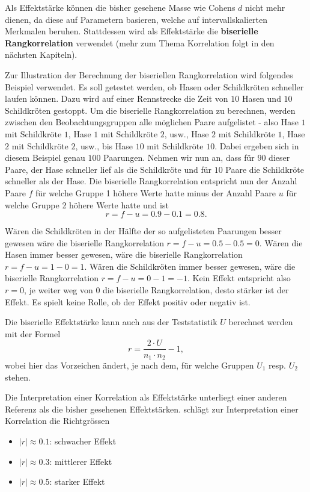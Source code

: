 \documentclass[
]{book}
\providecommand{\tightlist}{%
  \setlength{\itemsep}{0pt}\setlength{\parskip}{0pt}}
\theoremstyle{definition}
\theoremstyle{definition}
\theoremstyle{definition}
\theoremstyle{definition}
\theoremstyle{remark}
\begin{document}
Als Effektstärke können die bisher gesehene Masse wie Cohens \(d\) nicht
mehr dienen, da diese auf Parametern basieren, welche auf
intervallskalierten Merkmalen beruhen. Stattdessen wird als Effektstärke
die \label{customdef-biserielle-rangkorrelation}{\textbf{biserielle
Rangkorrelation}} verwendet (mehr zum Thema Korrelation folgt in den nächsten
Kapiteln).

Zur Illustration der Berechnung der biseriellen Rangkorrelation wird
folgendes Beispiel verwendet. Es soll getestet werden, ob Hasen oder
Schildkröten schneller laufen können. Dazu wird auf einer Rennstrecke
die Zeit von \(10\) Hasen und \(10\) Schildkröten gestoppt. Um die
biserielle Rangkorrelation zu berechnen, werden zwischen den
Beobachtungsgruppen alle möglichen Paare aufgelistet - also Hase \(1\) mit
Schildkröte \(1\), Hase \(1\) mit Schildkröte \(2\), usw., Hase \(2\) mit
Schildkröte \(1\), Hase \(2\) mit Schildkröte \(2\), usw., bis Hase \(10\) mit
Schildkröte \(10\). Dabei ergeben sich in diesem Beispiel genau \(100\)
Paarungen. Nehmen wir nun an, dass für \(90\) dieser Paare, der Hase
schneller lief als die Schildkröte und für \(10\) Paare die Schildkröte
schneller als der Hase. Die biserielle Rangkorrelation entspricht nun
der Anzahl Paare \(f\) für welche Gruppe 1 höhere Werte hatte minus der
Anzahl Paare \(u\) für welche Gruppe 2 höhere Werte hatte und ist
\[r = f - u = 0.9 - 0.1 = 0.8.\]

Wären die Schildkröten in der Hälfte der so aufgelisteten Paarungen
besser gewesen wäre die biserielle Rangkorrelation
\(r = f-u=0.5 - 0.5 = 0\). Wären die Hasen immer besser gewesen, wäre die
biserielle Rangkorrelation \(r = f-u = 1-0 = 1\). Wären die Schildkröten
immer besser gewesen, wäre die biserielle Rangkorrelation
\(r = f-u = 0-1 = -1\). Kein Effekt entspricht also \(r = 0\), je weiter weg
von \(0\) die biserielle Rangkorrelation, desto stärker ist der Effekt. Es
spielt keine Rolle, ob der Effekt positiv oder negativ ist.

Die biserielle Effektstärke kann auch aus der Teststatistik \(U\)
berechnet werden mit der Formel \[r = \frac{2\cdot U}{n_1\cdot n_2}-1,\]
wobei hier das Vorzeichen ändert, je nach dem, für welche Gruppen \(U_1\)
resp. \(U_2\) stehen.

Die Interpretation einer Korrelation als Effektstärke unterliegt einer
anderen Referenz als die bisher gesehenen Effektstärken. \citet{cohen1988}
schlägt zur Interpretation einer Korrelation die Richtgrössen

\begin{itemize}
\tightlist
\item
  \(|r| \approx 0.1\): schwacher Effekt
\item
  \(|r| \approx 0.3\): mittlerer Effekt
\item
  \(|r| \approx 0.5\): starker Effekt
\end{itemize}
\end{document}
